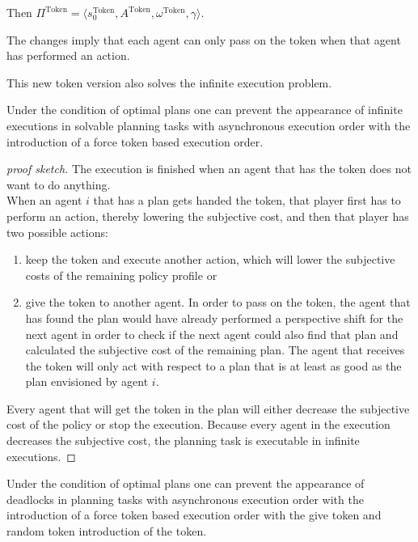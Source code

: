 Then $ \Pi^{\text{Token}} = \langle s_0^{\text{Token}}, A ^{\text{Token}}, \omega ^{\text{Token}}, \gamma \rangle $.

The changes imply that each agent can only pass on the token when that agent has performed an action.

This new token version also solves the infinite execution problem.

\begin{theorem}
  Under the condition of optimal plans one can prevent the appearance of infinite executions in solvable planning tasks with asynchronous execution order with the introduction of a force token based execution order.
\end{theorem}



\begin{proof}[proof sketch]
  The execution is finished when an agent that has the token does not want to do anything. \\
  When an agent $i$ that has a plan gets handed the token, that player first has to perform an action, thereby lowering the subjective cost, and then that player has two possible actions:
  \begin{enumerate}
    \item keep the token and execute another action, which will lower the subjective costs of the remaining policy profile or
    \item give the token to another agent. In order to pass on the token, the agent that has found the plan would have already performed a perspective shift for the next agent in order to check if the next agent could also find that plan and calculated the subjective cost of the remaining plan. The agent that receives the token will only act with respect to a plan that is at least as good as the plan envisioned by agent $i$.
  \end{enumerate}
  Every agent that will get the token in the plan will either decrease the subjective cost of the policy or stop the execution. Because every agent in the execution decreases the subjective cost, the planning task is executable in infinite executions.
\end{proof}

\begin{theorem}
Under the condition of optimal plans one can prevent the appearance of deadlocks in planning tasks with asynchronous execution order with the introduction of a force token based execution order with the give token and random token introduction of the token.
\end{theorem}

